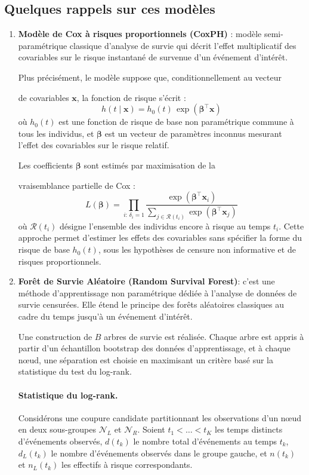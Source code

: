 \documentclass[12pt,a4paper]{article}
\begin{document}
\subsection{Quelques rappels sur ces modèles}
\begin{enumerate}
  \item \textbf{Modèle de Cox à risques proportionnels (CoxPH)} :
modèle semi-paramétrique classique d’analyse de survie qui décrit
l’effet multiplicatif des covariables sur le risque instantané de
survenue d'un événement d’intérêt.

Plus précisément, le modèle suppose que, conditionnellement au vecteur

de covariables $\mathbf{x}$, la fonction de risque s’écrit :
\begin{equation}
h(t \mid \mathbf{x}) = h_0(t)\,\exp\!\left(\boldsymbol{\beta}^\top \mathbf{x}\right)
\label{eq:cox-risk2}
\end{equation}
où $h_0(t)$ est une fonction de risque de base non paramétrique commune à tous les individus, et $\boldsymbol{\beta}$ est un vecteur de paramètres inconnus mesurant l’effet des covariables sur le risque relatif.

Les coefficients $\boldsymbol{\beta}$ sont estimés par maximisation de la

vraisemblance partielle de Cox :
\begin{equation}
L(\boldsymbol{\beta}) = \prod_{i:\,\delta_i = 1} \frac{\exp(\boldsymbol{\beta}^\top \mathbf{x}_i)}{\sum_{j \in \mathcal{R}(t_i)} \exp(\boldsymbol{\beta}^\top \mathbf{x}_j)}
\label{eq:cox-likelihood2}
\end{equation}
où $\mathcal{R}(t_i)$ désigne l’ensemble des individus encore à risque au temps $t_i$. Cette approche permet d’estimer les effets des covariables sans spécifier la forme du risque de base $h_0(t)$, sous les hypothèses de censure non informative et de risques proportionnels.
\item \textbf{Forêt de Survie Aléatoire (Random Survival Forest)}:
c'est une méthode d’apprentissage non paramétrique dédiée à l’analyse de données de survie censurées. Elle étend le principe des forêts aléatoires classiques au cadre du temps jusqu’à un événement d’intérêt.

Une construction de $B$ arbres de survie est réalisée. Chaque arbre est appris à partir d’un échantillon bootstrap des données d’apprentissage, et à chaque nœud, une séparation est choisie en maximisant un critère basé sur la statistique du test du log-rank.
\paragraph{Statistique du log-rank.}
Considérons une coupure candidate partitionnant les observations d’un nœud en deux sous-groupes $\mathcal{N}_L$ et $\mathcal{N}_R$. Soient $t_1 < \dots < t_K$ les temps distincts d’événements observés, $d(t_k)$ le nombre total d’événements au temps $t_k$, $d_L(t_k)$ le nombre d’événements observés dans le groupe gauche, et $n(t_k)$ et $n_L(t_k)$ les effectifs à risque correspondants.


\end{enumerate}
\end{document}

